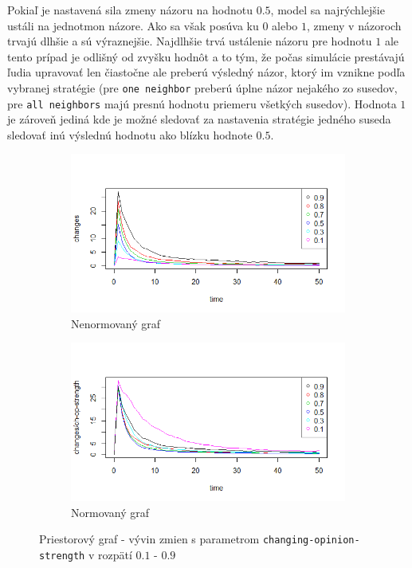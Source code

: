 \documentclass[10pt,a4paper]{report}
\begin{document}
Pokiaľ je nastavená sila zmeny názoru na hodnotu $0.5$, model sa najrýchlejšie ustáli na jednotmon názore. Ako sa však posúva ku $0$ alebo $1$, zmeny v názoroch trvajú dlhšie a sú výraznejšie. Najdlhšie trvá ustálenie názoru pre hodnotu $1$ ale tento prípad je odlišný od zvyšku hodnôt a to tým, že počas simulácie prestávajú ľudia upravovať len čiastočne ale preberú výsledný názor, ktorý im vznikne podľa vybranej stratégie (pre \texttt{one neighbor} preberú úplne názor nejakého zo susedov, pre \texttt{all neighbors} majú presnú hodnotu priemeru všetkých susedov). Hodnota $1$ je zároveň jediná kde je možné sledovať za nastavenia stratégie jedného suseda sledovať inú výslednú hodnotu ako blízku hodnote $0.5$.

\begin{figure}
\begin{subfigure}{.5\textwidth}
  \centering
  \includegraphics[width=1\linewidth]{plots/spatial-g/spatialChanges1-9.png}
  \caption{Nenormovaný graf}
  \label{fig:sfig1}
\end{subfigure}%
\begin{subfigure}{.5\textwidth}
  \centering
  
  \includegraphics[width=1\linewidth]{plots/spatial-g/spatialChanges1-9norm.png}
  \caption{Normovaný graf}
  \label{fig:sfig2}
\end{subfigure}
\caption{Priestorový graf - vývin zmien s parametrom \texttt{changing-opinion-strength} v rozpätí $0.1$ - $0.9$}
\label{fig:fig}
\end{figure}
\end{document}
